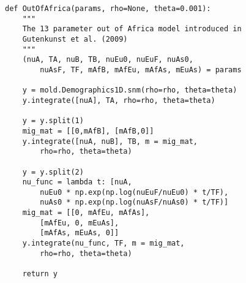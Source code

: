 \documentclass[10pt]{article}
\begin{document}
\begin{lstlisting}[caption={\textbf{Out of Africa model:} The \citet{Gutenkunst2009} Out-of-Africa model, with 13 parameters as originally defined. This model has three representative continental populations (often YRI, CEU, and CHB), with an out of Africa split between Eurasian and African populations, followed by a split between European and East Asian populations, with symmetric migration rates and size changes along each branch.}, float, label={lst:ooa}]
def OutOfAfrica(params, rho=None, theta=0.001):
    """
    The 13 parameter out of Africa model introduced in
    Gutenkunst et al. (2009)
    """
    (nuA, TA, nuB, TB, nuEu0, nuEuF, nuAs0, 
        nuAsF, TF, mAfB, mAfEu, mAfAs, mEuAs) = params
    
    y = mold.Demographics1D.snm(rho=rho, theta=theta)
    y.integrate([nuA], TA, rho=rho, theta=theta)
    
    y = y.split(1)
    mig_mat = [[0,mAfB], [mAfB,0]]
    y.integrate([nuA, nuB], TB, m = mig_mat,
        rho=rho, theta=theta)
        
    y = y.split(2)
    nu_func = lambda t: [nuA,
        nuEu0 * np.exp(np.log(nuEuF/nuEu0) * t/TF),
        nuAs0 * np.exp(np.log(nuAsF/nuAs0) * t/TF)]
    mig_mat = [[0, mAfEu, mAfAs],
        [mAfEu, 0, mEuAs],
        [mAfAs, mEuAs, 0]]
    y.integrate(nu_func, TF, m = mig_mat, 
        rho=rho, theta=theta)
        
    return y
\end{lstlisting}
\end{document}
